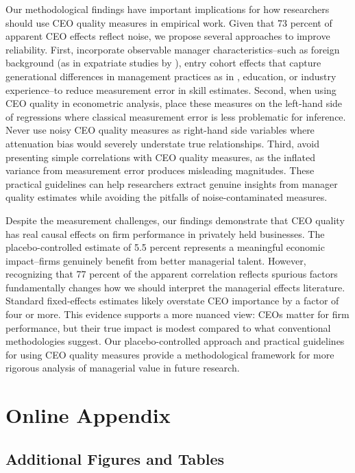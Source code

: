 \documentclass[11pt,a4paper]{article}
\begin{document}
Our methodological findings have important implications for how researchers should use CEO quality measures in empirical work. Given that 73 percent of apparent CEO effects reflect noise, we propose several approaches to improve reliability. First, incorporate observable manager characteristics\---such as foreign background (as in expatriate studies by \citet{Koren2023expat}), entry cohort effects that capture generational differences in management practices as in \citet{koren2024managers}, education, or industry experience\---to reduce measurement error in skill estimates. Second, when using CEO quality in econometric analysis, place these measures on the left-hand side of regressions where classical measurement error is less problematic for inference. Never use noisy CEO quality measures as right-hand side variables where attenuation bias would severely understate true relationships. Third, avoid presenting simple correlations with CEO quality measures, as the inflated variance from measurement error produces misleading magnitudes. These practical guidelines can help researchers extract genuine insights from manager quality estimates while avoiding the pitfalls of noise-contaminated measures.

Despite the measurement challenges, our findings demonstrate that CEO quality has real causal effects on firm performance in privately held businesses. The placebo-controlled estimate of 5.5 percent represents a meaningful economic impact\---firms genuinely benefit from better managerial talent. However, recognizing that 77 percent of the apparent correlation reflects spurious factors fundamentally changes how we should interpret the managerial effects literature. Standard fixed-effects estimates likely overstate CEO importance by a factor of four or more. This evidence supports a more nuanced view: CEOs matter for firm performance, but their true impact is modest compared to what conventional methodologies suggest. Our placebo-controlled approach and practical guidelines for using CEO quality measures provide a methodological framework for more rigorous analysis of managerial value in future research.





\appendix
\section{Online Appendix}
\subsection{Additional Figures and Tables}
\renewcommand{\thefigure}{A\arabic{figure}}
\renewcommand{\thetable}{A\arabic{table}}
\end{document}

